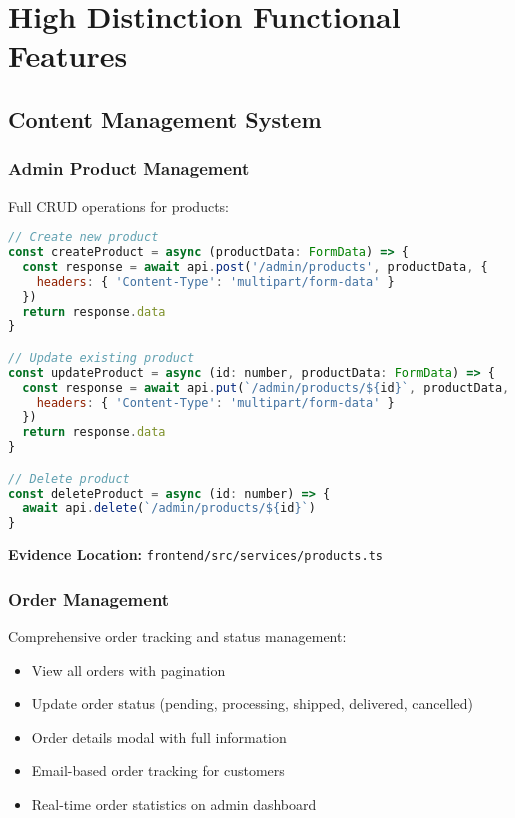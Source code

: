 \documentclass[12pt,a4paper]{article}
\begin{document}
\section{High Distinction Functional Features}

\subsection{Content Management System}

\subsubsection{Admin Product Management}
Full CRUD operations for products:

\begin{lstlisting}[language=javascript, caption=Product CRUD Operations]
// Create new product
const createProduct = async (productData: FormData) => {
  const response = await api.post('/admin/products', productData, {
    headers: { 'Content-Type': 'multipart/form-data' }
  })
  return response.data
}

// Update existing product
const updateProduct = async (id: number, productData: FormData) => {
  const response = await api.put(`/admin/products/${id}`, productData, {
    headers: { 'Content-Type': 'multipart/form-data' }
  })
  return response.data
}

// Delete product
const deleteProduct = async (id: number) => {
  await api.delete(`/admin/products/${id}`)
}
\end{lstlisting}

\textbf{Evidence Location:} \texttt{frontend/src/services/products.ts}

\subsubsection{Order Management}
Comprehensive order tracking and status management:

\begin{itemize}
    \item View all orders with pagination
    \item Update order status (pending, processing, shipped, delivered, cancelled)
    \item Order details modal with full information
    \item Email-based order tracking for customers
    \item Real-time order statistics on admin dashboard
\end{itemize}
\end{document}
